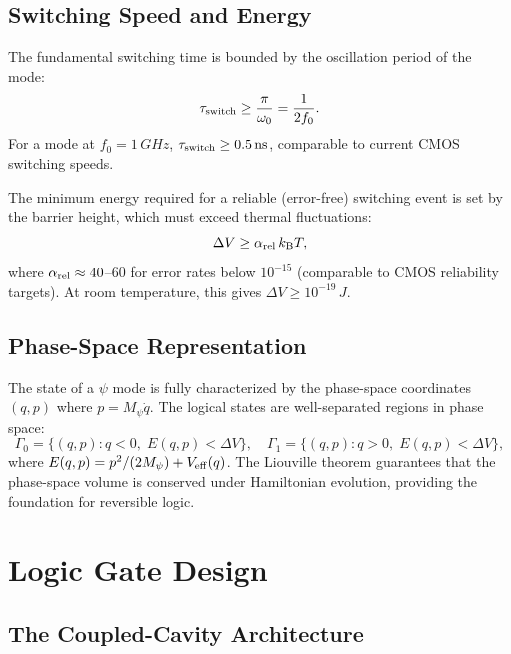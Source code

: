 \documentclass[12pt,a4paper,twoside]{article}
\newcommand{\kB}{k_{\mathrm{B}}}
\begin{document}
\subsection{Switching Speed and Energy}\label{sec:switch_speed}

The fundamental switching time is bounded by the oscillation period of the mode:
\begin{equation}
\tau_{\rm switch} \geq \frac{\pi}{\omega_0} = \frac{1}{2f_0}.
\label{eq:switch_time}
\end{equation}
For a mode at $f_0 = 1\,\si{GHz}$, $\tau_{\rm switch} \geq 0.5\,\si{ns}$, comparable to current CMOS switching speeds.

The minimum energy required for a reliable (error-free) switching event is set by the barrier height, which must exceed thermal fluctuations:
\begin{equation}
\Delta V \geq \alpha_{\rm rel}\,\kB T,
\label{eq:reliability}
\end{equation}
where $\alpha_{\rm rel} \approx 40$--$60$ for error rates below $10^{-15}$ (comparable to CMOS reliability targets). At room temperature, this gives $\Delta V \geq 10^{-19}\,\si{J}$.

\subsection{Phase-Space Representation}\label{sec:phase_space}

The state of a $\psi$ mode is fully characterized by the phase-space coordinates $(q, p)$ where $p = M_\psi \dot{q}$. The logical states are well-separated regions in phase space:
\begin{equation}
\Gamma_0 = \{(q,p) : q < 0,\; E(q,p) < \Delta V\}, \quad \Gamma_1 = \{(q,p) : q > 0,\; E(q,p) < \Delta V\},
\label{eq:phase_regions}
\end{equation}
where $E(q,p) = p^2/(2M_\psi) + V_{\rm eff}(q)$. The Liouville theorem guarantees that the phase-space volume is conserved under Hamiltonian evolution, providing the foundation for reversible logic.

\section{Logic Gate Design}\label{sec:gates}

\subsection{The Coupled-Cavity Architecture}\label{sec:coupled_cavity}
\end{document}
